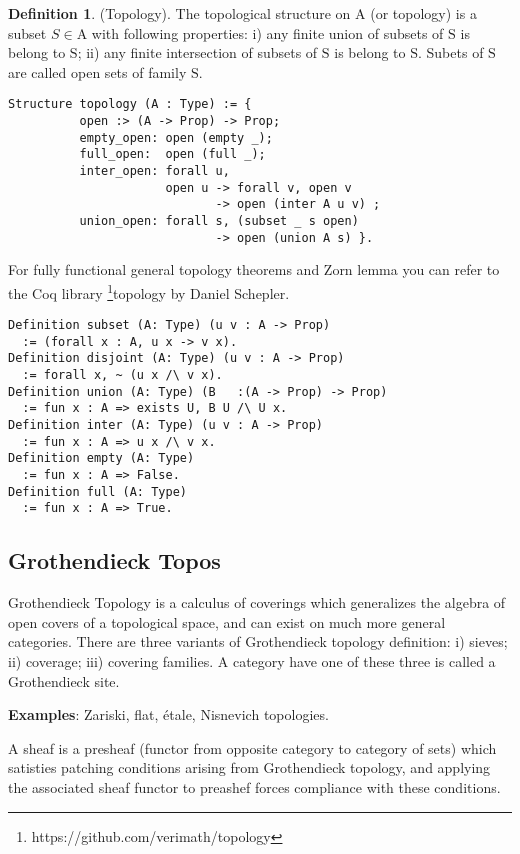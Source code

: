 \documentclass{article}
\theoremstyle{definition}
\newtheorem{definition}{Definition}
\begin{document}
\begin{definition} (Topology). The topological structure on $\mathrm{A}$
(or topology) is a subset $S \in \mathrm{A}$ with following properties:
i) any finite union of subsets of $\mathrm{S}$ is belong to $\mathrm{S}$;
ii) any finite intersection of subsets of $\mathrm{S}$ is belong to $\mathrm{S}$.
Subets of $\mathrm{S}$ are called open sets of family $\mathrm{S}$.
\begin{lstlisting}
Structure topology (A : Type) := {
          open :> (A -> Prop) -> Prop;
          empty_open: open (empty _);
          full_open:  open (full _);
          inter_open: forall u,
                      open u -> forall v, open v
                             -> open (inter A u v) ;
          union_open: forall s, (subset _ s open)
                             -> open (union A s) }.
\end{lstlisting}
For fully functional general topology theorems and Zorn lemma you can refer to
the Coq library \footnote{https://github.com/verimath/topology}{topology} by Daniel Schepler.
\newpage
\begin{lstlisting}
Definition subset (A: Type) (u v : A -> Prop)
  := (forall x : A, u x -> v x).
Definition disjoint (A: Type) (u v : A -> Prop)
  := forall x, ~ (u x /\ v x).
Definition union (A: Type) (B   :(A -> Prop) -> Prop)
  := fun x : A => exists U, B U /\ U x.
Definition inter (A: Type) (u v : A -> Prop)
  := fun x : A => u x /\ v x.
Definition empty (A: Type)
  := fun x : A => False.
Definition full (A: Type)
  := fun x : A => True.
\end{lstlisting}
\end{definition}

\subsection{Grothendieck Topos}

Grothendieck Topology is a calculus of coverings which generalizes the algebra
of open covers of a topological space, and can exist on much more general categories.
There are three variants of Grothendieck topology definition:
i) sieves; ii) coverage; iii) covering families.
A category have one of these three is called a Grothendieck site.

{\bf Examples}: Zariski, flat, étale, Nisnevich topologies.

A sheaf is a presheaf (functor from opposite category to category of sets) which
satisties patching conditions arising from Grothendieck topology, and applying
the associated sheaf functor to preashef forces compliance with these conditions.
\end{document}
